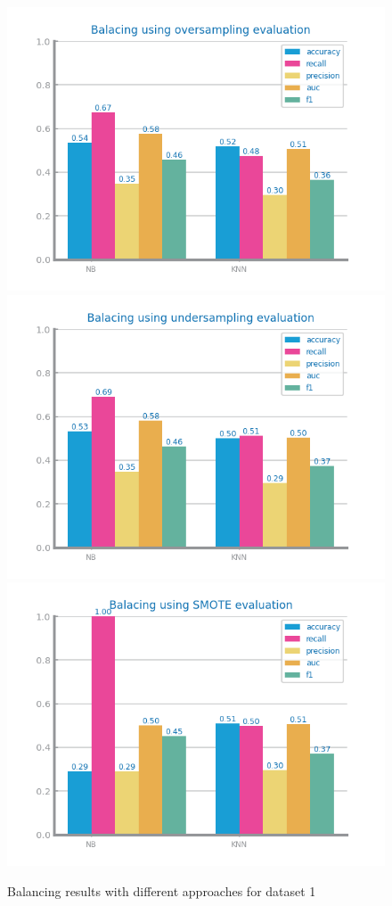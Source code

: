\documentclass[10pt]{extarticle}
\begin{document}
\begin{figure}[H]
\centering\includegraphics[scale=0.80]{images/dataset1/data_preparation/CovidPos_balancing_oversampling.png}
\includegraphics[scale=0.80]{images/dataset1/data_preparation/CovidPos_balancing_undersampling.png}
\includegraphics[scale=0.80]{images/dataset1/data_preparation/CovidPos_balancing_SMOTE.png}
\caption{Balancing results with different approaches for dataset 1}
\end{figure}
\end{document}
